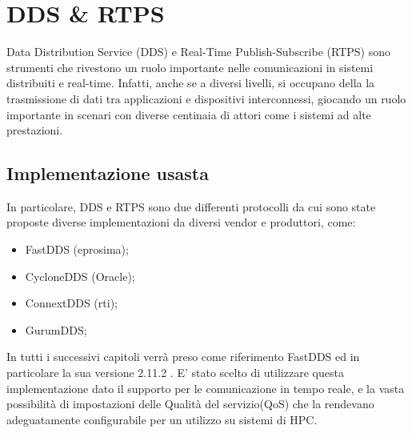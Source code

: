 \chapter{DDS \& RTPS}\label{Chapter:dds}
Data Distribution Service (DDS)\cite{DDS} e Real-Time Publish-Subscribe (RTPS)\cite{RTPS} sono strumenti che rivestono un ruolo importante nelle comunicazioni in sistemi distribuiti e real-time. Infatti, anche se a diversi livelli, si occupano della la trasmissione di dati tra applicazioni e dispositivi interconnessi, giocando un ruolo importante in scenari con diverse centinaia di attori come i sistemi ad alte prestazioni. 


\section{Implementazione usasta}
In particolare, DDS e RTPS sono due differenti protocolli da cui sono state proposte diverse implementazioni da diversi vendor e produttori, come:
\begin{itemize}
  \item FastDDS (eprosima);
  \item CycloneDDS (Oracle);
  \item ConnextDDS (rti);
  \item GurumDDS;
\end{itemize}

In tutti i successivi capitoli verrà preso come riferimento FastDDS ed in particolare la sua versione 2.11.2 \cite{FastDDS}. E' stato scelto di utilizzare questa implementazione dato il supporto per le comunicazione in tempo reale, e la vasta possibilità di impostazioni delle Qualità del servizio(QoS) che la rendevano adeguatamente configurabile per un utilizzo su sistemi di HPC.


